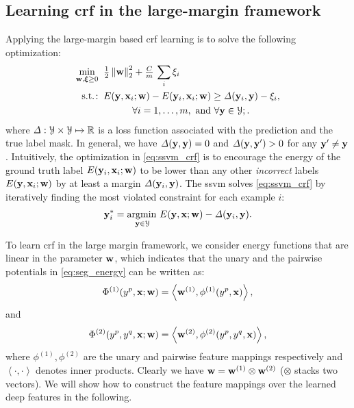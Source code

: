 \documentclass[10pt,3p]{elsarticle}
\def\half{{\tfrac{1}{2} }}
\def\argmin{\operatorname*{argmin\,}}
\def\Real{\mathbb{R}}
\newcommand{\ssvm}{{\sc ssvm}\xspace}
\newcommand{\crf}{{\sc crf}\xspace}
\def\bw{{\bf w}}
\def\bx{{\bf x}}
\def\by{{\bf y}}
\def\bh{{ \Phi }}
\let\x\bx
\let\y\by
\let\w\bw
\def\z{{\bf y}'}
\def\bxi{{\boldsymbol \xi}}
\def\calY{{\cal Y}}
\def\loss{{\it \Delta}}
\newcommand{\st}{{{\rm s.t.}\!:}\xspace}
\newcommand{\fnorm}[2][2]{\ensuremath{ \left\| #2 \right\|_{ \mathrm{#1} } } }
\begin{document}
\subsection{Learning \crf in the large-margin framework}
Applying the large-margin based \crf learning is to solve the following optimization:
\begin{align}
  \min_{\bw, \bxi \geq 0}   \;\; &
        \half \fnorm{\bw}^2 +  {\tfrac{C}{m}} \, \sum_i \xi_i \notag \\
  \st  \;\; &
    E(\y, \x_i; \w)- E (\y_i, \x_i; \w )\geq
    \loss ( \y_i, \y) - \xi_i, \notag \\
   & \quad\quad\quad
   \forall i=1, \dots, m,
   \text{ and }\forall \y \in  {\cal Y};.
\label{eq:ssvm_crf}
\end{align}
where $\loss: \calY \times \calY \mapsto \Real$ is a loss function associated with the prediction and the true label mask.  In general, we have $ \loss( \y, \y ) = 0$ and $ \loss(\y, \z ) > 0 $ for any $ \z \neq \y $.
Intuitively, the optimization in \eqref{eq:ssvm_crf} is to encourage the
energy of the ground truth label $E(\y_i,\x_i; \w)$ to be lower than any other
{\em incorrect} labels $E(\y, \x_i; \w)$ by at least a margin $\loss (
\y_i, \y)$. The \ssvm solves \eqref{eq:ssvm_crf} by iteratively finding the most violated constraint for each example $i$:
\begin{align}
\y_i^{*}=\argmin_{ \y \in  {\cal Y}} E(\y, \x; \w) - \loss(\y_i, \y).
\label{eq:inf_crf}
\end{align}

To learn \crf in the large margin framework, we consider energy functions that are linear in the parameter $\w$, which indicates that the unary and the pairwise potentials in \eqref{eq:seg_energy} can be written as:
\begin{align}
\bh^{(1)}(y^{p}, \x;\w) = \left\langle\w^{(1)}, \phi^{(1)}(y^p, \x)\right\rangle,
\end{align}
and
\begin{align}
\bh^{(2)}(y^{p}, y^{q}, \x;\w) = \left\langle \w^{(2)}, \phi^{(2)}(y^{p}, y^{q}, \x) \right\rangle,
\end{align}
where $\phi^{(1)}, \phi^{(2)}$ are the unary and pairwise feature mappings respectively and $\left\langle \cdot, \cdot \right\rangle$ denotes inner products. Clearly we have $\w=\w^{(1)}\otimes\w^{(2)}$ ($\otimes$ stacks two vectors).
We will show how to construct the feature mappings over the learned deep features in the following.
\end{document}
